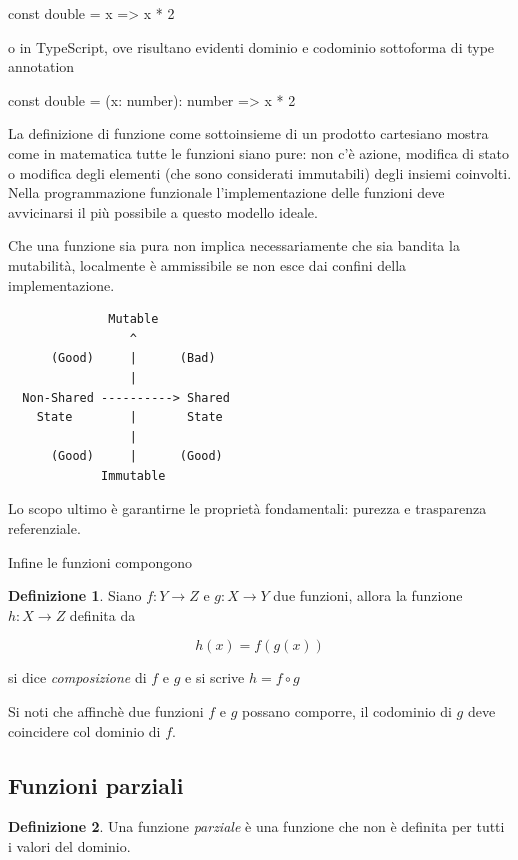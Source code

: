 \documentclass[12pt]{article}
\theoremstyle{definition}
\newtheorem{definition}{Definizione}[section]
\newenvironment{code}
  {\vspace{0.5cm} \VerbatimEnvironment\begin{typescriptcode}}
  {\end{typescriptcode} \vspace{0.2cm}}
\begin{document}
\begin{code}
const double = x => x * 2
\end{code}

o in TypeScript, ove risultano evidenti dominio e codominio sottoforma di type annotation

\begin{code}
const double = (x: number): number => x * 2
\end{code}

La definizione di funzione come sottoinsieme di un prodotto cartesiano mostra come in matematica tutte le funzioni siano pure:
non c'è azione, modifica di stato o modifica degli elementi (che sono considerati immutabili) degli insiemi coinvolti.
Nella programmazione funzionale l'implementazione delle funzioni deve avvicinarsi il più possibile a questo modello ideale.

Che una funzione sia pura non implica necessariamente che sia bandita la mutabilità, localmente è ammissibile
se non esce dai confini della implementazione.

\begin{verbatim}
              Mutable
                 ^
      (Good)     |      (Bad)
                 |
  Non-Shared ----------> Shared
    State        |       State
                 |
      (Good)     |      (Good)
             Immutable
\end{verbatim}

Lo scopo ultimo è garantirne le proprietà fondamentali: purezza e trasparenza referenziale.

Infine le funzioni compongono

\begin{definition}
Siano $f: Y \rightarrow Z$ e $g: X \rightarrow Y$ due funzioni, allora la funzione $h: X \rightarrow Z$ definita da

$$
h(x) = f(g(x))
$$

si dice \emph{composizione} di $f$ e $g$ e si scrive $h = f \circ g$

\end{definition}

Si noti che affinchè due funzioni $f$ e $g$ possano comporre, il codominio di $g$ deve coincidere col dominio di $f$.

\subsection{Funzioni parziali}

\begin{definition}
Una funzione \emph{parziale} è una funzione che non è definita per tutti i valori del dominio.
\end{definition}
\end{document}

